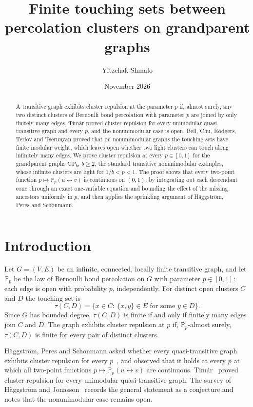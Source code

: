 \documentclass[11pt]{amsart}
\title[Cluster repulsion on grandparent graphs]{Finite touching sets between percolation clusters on grandparent
graphs}
\author{Yitzchak Shmalo}
\date{November 2026}
\theoremstyle{remark}
\newcommand{\PP}{\mathbb{P}}
\newcommand{\GP}{\mathrm{GP}_b}
\begin{document}
\begin{abstract}
A transitive graph exhibits cluster repulsion at the parameter $p$ if, almost surely, any two distinct clusters of
Bernoulli bond percolation with parameter $p$ are joined by only finitely many edges. Timár proved cluster repulsion for
every unimodular quasi-transitive graph and every $p$, and the nonunimodular case is open. Bell, Chu, Rodgers, Terlov and
Tserunyan proved that on nonunimodular graphs the touching sets have finite modular weight, which leaves open whether
two light clusters can touch along infinitely many edges. We prove cluster repulsion at every $p\in[0,1]$ for the
grandparent graphs $\GP$, $b\ge2$, the standard transitive nonunimodular examples, whose infinite clusters are light for
$1/b<p<1$. The proof shows that every two-point function $p\mapsto\PP_p(u\leftrightarrow v)$ is continuous on $(0,1)$,
by integrating out each descendant cone through an exact one-variable equation and bounding the effect of the missing
ancestors uniformly in $p$, and then applies the sprinkling argument of Häggström, Peres and Schonmann.
\end{abstract}
\maketitle

\section{Introduction}\label{sec:intro}

Let $G=(V,E)$ be an infinite, connected, locally finite transitive graph, and let $\PP_p$ be the law of Bernoulli bond
percolation on $G$ with parameter $p\in[0,1]$: each edge is open with probability $p$, independently. For distinct open
clusters $C$ and $D$ the touching set is
\[
\tau(C,D)=\{x\in C:\ \{x,y\}\in E\text{ for some }y\in D\}.
\]
Since $G$ has bounded degree, $\tau(C,D)$ is finite if and only if finitely many edges join $C$ and $D$. The graph
exhibits cluster repulsion at $p$ if, $\PP_p$-almost surely, $\tau(C,D)$ is finite for every pair of distinct clusters.

Häggström, Peres and Schonmann asked whether every quasi-transitive graph exhibits cluster repulsion for every
$p$~\cite[p.~87]{HPS99}, and observed that it holds at every $p$ at which all two-point functions
$p\mapsto\PP_p(u\leftrightarrow v)$ are continuous. Timár~\cite[Theorem~1.1]{Tim06a} proved cluster repulsion for every
unimodular quasi-transitive graph. The survey of Häggström and Jonasson~\cite[end of Section~5]{HJ06} records the general
statement as a conjecture and notes that the nonunimodular case remains open.
\end{document}
